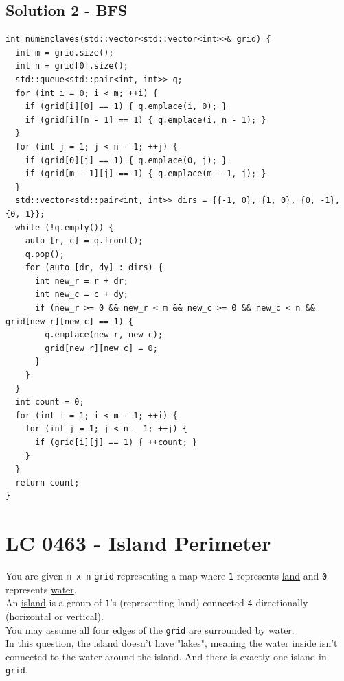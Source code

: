 \subsection*{Solution 2 - BFS}
\begin{lstlisting}
int numEnclaves(std::vector<std::vector<int>>& grid) {
  int m = grid.size();
  int n = grid[0].size();
  std::queue<std::pair<int, int>> q;
  for (int i = 0; i < m; ++i) {
    if (grid[i][0] == 1) { q.emplace(i, 0); }
    if (grid[i][n - 1] == 1) { q.emplace(i, n - 1); }
  }
  for (int j = 1; j < n - 1; ++j) {
    if (grid[0][j] == 1) { q.emplace(0, j); }
    if (grid[m - 1][j] == 1) { q.emplace(m - 1, j); }
  }
  std::vector<std::pair<int, int>> dirs = {{-1, 0}, {1, 0}, {0, -1}, {0, 1}};
  while (!q.empty()) {
    auto [r, c] = q.front();
    q.pop();
    for (auto [dr, dy] : dirs) {
      int new_r = r + dr;
      int new_c = c + dy;
      if (new_r >= 0 && new_r < m && new_c >= 0 && new_c < n && grid[new_r][new_c] == 1) {
        q.emplace(new_r, new_c);
        grid[new_r][new_c] = 0;
      }
    }
  }
  int count = 0;
  for (int i = 1; i < m - 1; ++i) {
    for (int j = 1; j < n - 1; ++j) {
      if (grid[i][j] == 1) { ++count; }
    }
  }
  return count;
}
\end{lstlisting}

\section{LC 0463 - Island Perimeter}
You are given {\colorbox{CodeBackground}{\lstinline|m x n|}} {\colorbox{CodeBackground}{\lstinline|grid|}} representing a map where {\colorbox{CodeBackground}{\lstinline|1|}} represents \ul{land} and {\colorbox{CodeBackground}{\lstinline|0|}} represents \ul{water}.\\

An \ul{island} is a group of {\colorbox{CodeBackground}{\lstinline|1|}}'s (representing land) connected {\colorbox{CodeBackground}{\lstinline|4|}}-directionally (horizontal or vertical). \\

You may assume all four edges of the {\colorbox{CodeBackground}{\lstinline|grid|}} are surrounded by water.\\

In this question, the island doesn't have "lakes", meaning the water inside isn't connected to the water around the island. And there is exactly one island in {\colorbox{CodeBackground}{\lstinline|grid|}}.\\

